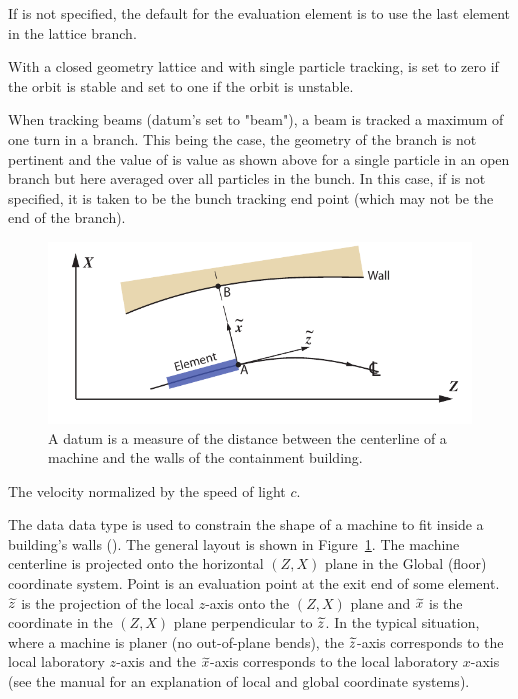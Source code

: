 \begin{description}
{{{{{If  is not specified, the default for the evaluation element is to use
the last element in the lattice branch.

With a closed geometry lattice and with single particle tracking,  is set to zero
if the orbit is stable and set to one if the orbit is unstable.

When tracking beams (datum's  set to "beam"), a beam is tracked a maximum of one
turn in a branch. This being the case, the geometry of the branch is not pertinent and the value of
 is value as shown above for a single particle in an open branch but here averaged
over all particles in the bunch. In this case, if  is not specified, it is taken to be
the bunch tracking end point (which may not be the end of the branch).

\begin{figure}
  \centering
  \includegraphics[width=5in]{building-wall-constraint.pdf}
  \caption[Building wall datum]
{A  datum is a measure of the distance between the
centerline of a machine and the walls of the containment building.}
  \label{f:wall.constraint}
\end{figure}

  \item[velocity, velocity.x, .y, .z] \Newline {}
The velocity normalized by the speed of light $c$.

  \item[wall.left_side, .right_side] \Newline {}
The  data data type is used to constrain the shape of a machine to fit inside a building's
walls (). The general layout is shown in Figure~\ref{f:wall.constraint}. The
machine centerline is projected onto the horizontal $(Z, X)$ plane in the Global (floor) coordinate
system. Point  is an evaluation point at the exit end of some element. $\widetilde z$ is the
projection of the local $z$-axis onto the $(Z, X)$ plane and $\widetilde x$ is the coordinate in the $(Z,
X)$ plane perpendicular to $\widetilde z$. In the typical situation, where a machine is planer (no
out-of-plane bends), the $\widetilde z$-axis corresponds to the local laboratory $z$-axis and the $\widetilde
x$-axis corresponds to the local laboratory $x$-axis (see the \bmad manual for an explanation of
local and global coordinate systems).

}}}}}
\end{description}
